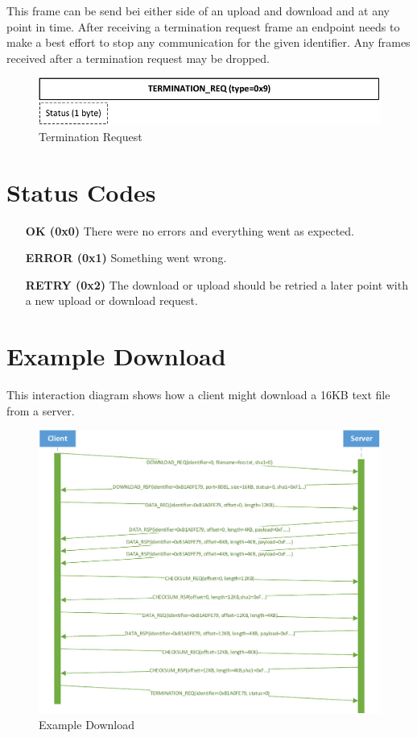\documentclass[]{article}
\begin{document}
This frame can be send bei either side of an upload and
download and at any point in time. After receiving
a termination request frame an endpoint needs to make a best
effort to stop any communication for the given identifier.
Any frames received after a termination request may be dropped.

\begin{figure}[H]
\centering
\includegraphics[width=\textwidth]{frames/shutdown-req.pdf}
\caption{Termination Request}
\label{TERMINATION-REQ}
\end{figure}

\section{Status Codes}

\begin{itemize}
\item[\textbf{OK (0x0)}] There were no errors and everything went as expected. 
\item[\textbf{ERROR (0x1)}] Something went wrong.
\item[\textbf{RETRY (0x2)}] The download or upload should be retried a later point with a new upload or download request.
\end{itemize}

\newpage

\section{Example Download}
This interaction diagram shows how a client might download a 16KB text file from a server.

\begin{figure}[H]
\centering
\includegraphics[width=\textwidth]{frames/download-interaction.pdf}
\caption{Example Download}
\label{EXAMPLE-DOWNLOAD}
\end{figure}
\end{document}
